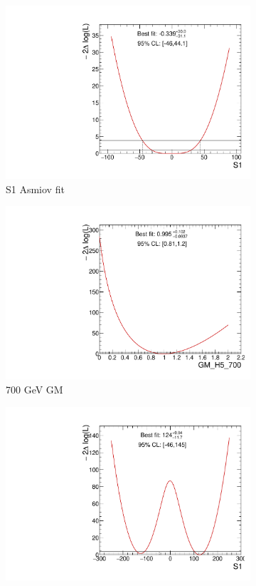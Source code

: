 \documentclass[../Bachelorarbeit.tex]{subfiles}
\begin{document}
\begin{figure}[h]
    \centering
    \begin{subfigure}{0.3\textwidth}
        \includegraphics[width=\textwidth]{Plots/operators/S1_asimov.pdf}
        \caption{S1 Asmiov fit}
    \end{subfigure}
    \begin{subfigure}{0.3\textwidth}
        \includegraphics[width=\textwidth]{Plots/operators/GM_H5_700_scan_coef.pdf}
        \caption{700 GeV GM}
    \end{subfigure}
    \begin{subfigure}{0.3\textwidth}
        \includegraphics[width=\textwidth]{Plots/operators/S1_EFT.pdf}

\end{subfigure}
\end{figure}
\end{document}
